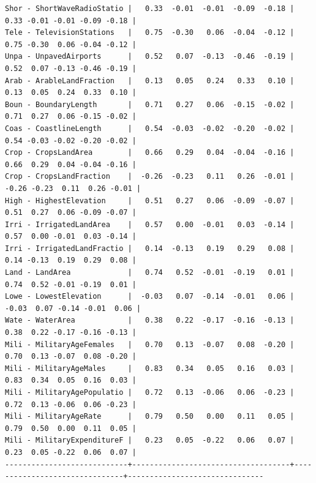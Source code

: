 \documentclass[a4paper,10pt,twocolumn]{article}
\begin{document}
\begin{landscape}
\begin{verbatim}
Shor - ShortWaveRadioStatio |   0.33  -0.01  -0.01  -0.09  -0.18 |  0.33 -0.01 -0.01 -0.09 -0.18 |
Tele - TelevisionStations   |   0.75  -0.30   0.06  -0.04  -0.12 |  0.75 -0.30  0.06 -0.04 -0.12 |
Unpa - UnpavedAirports      |   0.52   0.07  -0.13  -0.46  -0.19 |  0.52  0.07 -0.13 -0.46 -0.19 |
Arab - ArableLandFraction   |   0.13   0.05   0.24   0.33   0.10 |  0.13  0.05  0.24  0.33  0.10 |
Boun - BoundaryLength       |   0.71   0.27   0.06  -0.15  -0.02 |  0.71  0.27  0.06 -0.15 -0.02 |
Coas - CoastlineLength      |   0.54  -0.03  -0.02  -0.20  -0.02 |  0.54 -0.03 -0.02 -0.20 -0.02 |
Crop - CropsLandArea        |   0.66   0.29   0.04  -0.04  -0.16 |  0.66  0.29  0.04 -0.04 -0.16 |
Crop - CropsLandFraction    |  -0.26  -0.23   0.11   0.26  -0.01 | -0.26 -0.23  0.11  0.26 -0.01 |
High - HighestElevation     |   0.51   0.27   0.06  -0.09  -0.07 |  0.51  0.27  0.06 -0.09 -0.07 |
Irri - IrrigatedLandArea    |   0.57   0.00  -0.01   0.03  -0.14 |  0.57  0.00 -0.01  0.03 -0.14 |
Irri - IrrigatedLandFractio |   0.14  -0.13   0.19   0.29   0.08 |  0.14 -0.13  0.19  0.29  0.08 |
Land - LandArea             |   0.74   0.52  -0.01  -0.19   0.01 |  0.74  0.52 -0.01 -0.19  0.01 |
Lowe - LowestElevation      |  -0.03   0.07  -0.14  -0.01   0.06 | -0.03  0.07 -0.14 -0.01  0.06 |
Wate - WaterArea            |   0.38   0.22  -0.17  -0.16  -0.13 |  0.38  0.22 -0.17 -0.16 -0.13 |
Mili - MilitaryAgeFemales   |   0.70   0.13  -0.07   0.08  -0.20 |  0.70  0.13 -0.07  0.08 -0.20 |
Mili - MilitaryAgeMales     |   0.83   0.34   0.05   0.16   0.03 |  0.83  0.34  0.05  0.16  0.03 |
Mili - MilitaryAgePopulatio |   0.72   0.13  -0.06   0.06  -0.23 |  0.72  0.13 -0.06  0.06 -0.23 |
Mili - MilitaryAgeRate      |   0.79   0.50   0.00   0.11   0.05 |  0.79  0.50  0.00  0.11  0.05 |
Mili - MilitaryExpenditureF |   0.23   0.05  -0.22   0.06   0.07 |  0.23  0.05 -0.22  0.06  0.07 |
----------------------------+------------------------------------+-------------------------------+-------------------------------


\end{verbatim}
\end{landscape}
\end{document}
